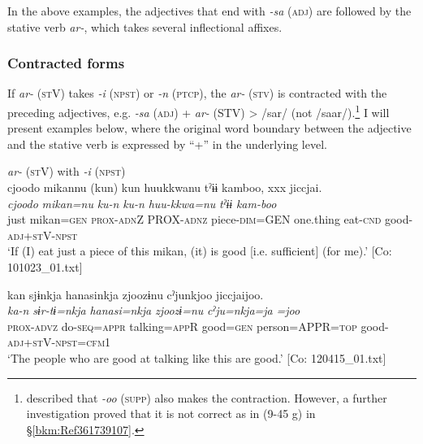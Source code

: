 In the above examples, the adjectives that end with \textit{{}-sa} (\textsc{adj}) are followed by the stative verb \textit{ar-}, which takes several inflectional affixes.

\subsubsection{Contracted forms}\label{sec:9.2.2.2}

If \textit{ar-} (\textsc{st}V) takes \textit{{}-i} (\textsc{npst}) or \textit{{}-n} (\textsc{ptcp}), the \textit{ar-} (\textsc{stv}) is contracted with the preceding adjectives, e.g. \textit{{}-sa} (\textsc{adj}) + \textit{ar-} (STV) > /sar/ (not /saar/).\footnote{\citet[71]{Niinaga2010} described that \textit{{}-oo} (\textsc{supp}) also makes the contraction. However, a further investigation proved that it is not correct as in (9-45 g) in §\ref{bkm:Ref361739107}.} I will present examples below, where the original word boundary between the adjective and the stative verb is expressed by “+” in the underlying level.

\ea   \textit{ar-} (\textsc{st}V) with \textit{{}-i} (\textsc{npst}) \label{ex:9.46}
  \ea\relax [= (7-25 b)]\\
    \glll  {\textbar}cjoodo  mikan{\textbar}nu  (kun)  kun  huukkwanu   tˀɨɨ  kamboo,  xxx  jiccjai.\\
      \textit{cjoodo}  \textit{mikan=nu}  \textit{ku-n}  \textit{ku-n}  \textit{huu-kkwa=nu}   \textit{tˀɨɨ}  \textit{kam-boo}    \textit{}\\
      just  mikan=\textsc{gen}  \textsc{prox}-\textsc{adn}Z  PROX-\textsc{adnz}  piece-\textsc{dim}=GEN  one.thing  eat-\textsc{cnd}    good-\textsc{adj}+\textsc{st}V-\textsc{npst}\\
      \glt       ‘If (I) eat just a piece of this mikan, (it) is good [i.e. sufficient] (for me).’ [Co: 101023\_01.txt]

\ex \label{ex:9.46b} %
    \glll  kan  sjɨnkja  hanasinkja  zjoozɨnu cˀjunkjoo  jiccjaijoo.\\
      \textit{ka-n}  \textit{sɨr-tɨ=nkja}  \textit{hanasi=nkja}  \textit{zjoozɨ=nu}  \textit{cˀju=nkja=ja}  \textit{=joo}\\
      \textsc{prox}-\textsc{advz}  do-\textsc{seq}=\textsc{appr}  talking=\textsc{app}R  good=\textsc{gen}   person=APPR=\textsc{top}  good-\textsc{adj}+\textsc{st}V-\textsc{npst}=\textsc{cfm}1\\
      \glt       ‘The people who are good at talking like this are good.’ [Co: 120415\_01.txt]

